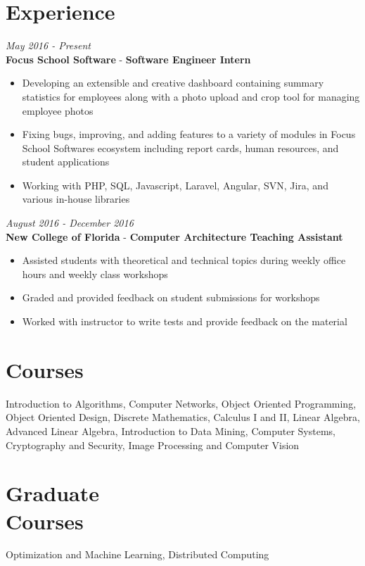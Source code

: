 \documentclass[margin,line,a4paper]{resume}
\begin{document}
\begin{resume}
    \section{\mysidestyle Experience}
        \textit{May 2016 - Present}\\
        \textbf{Focus School Software} - \textbf{Software Engineer Intern}
        \begin{itemize}
            \item Developing an extensible and creative dashboard containing summary statistics for employees along with a photo upload and crop tool for managing employee photos
            \item Fixing bugs, improving, and adding features to a variety of modules in Focus School Software\textquotesingle s ecosystem including report cards, human resources, and student applications
            \item Working with PHP, SQL, Javascript, Laravel, Angular, SVN, Jira, and various in-house libraries
        \end{itemize}
            
        \textit{August 2016 - December 2016}\\
        \textbf{New College of Florida} - \textbf{Computer Architecture Teaching Assistant}
        \begin{itemize}
            \item Assisted students with theoretical and technical topics during weekly office hours and weekly class workshops
            \item Graded and provided feedback on student submissions for workshops
            \item Worked with instructor to write tests and provide feedback on the material
        \end{itemize}
        
    \section{\mysidestyle Courses}
        Introduction to Algorithms, Computer Networks, Object Oriented Programming, Object Oriented Design, Discrete Mathematics, Calculus I and II, Linear Algebra, Advanced Linear Algebra, Introduction to Data Mining, Computer Systems, Cryptography and Security, Image Processing and Computer Vision
        
    \section{\mysidestyle Graduate\\Courses}
        Optimization and Machine Learning, Distributed Computing
        
\end{resume}
\end{document}
